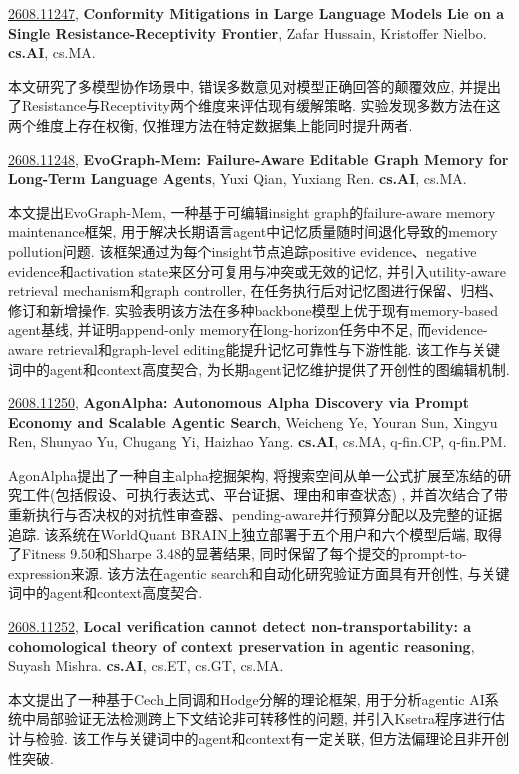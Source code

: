 \documentclass[9pt, a4paper]{article}
\theoremstyle{plain}
\theoremstyle{definition}
\theoremstyle{remark}
\newcommand{\arxivwithtarget}[3]{\hypertarget{#1}{}\href{https://arxiv.org/abs/#1}{#1}, \textbf{\textcolor{arxivblue}{#2}}, #3. }
\begin{document}
\arxivwithtarget{2608.11247}{Conformity Mitigations in Large Language Models Lie on a Single Resistance-Receptivity Frontier}{Zafar Hussain, Kristoffer Nielbo}\textbf{cs.AI}, cs.MA.

本文研究了多模型协作场景中, 错误多数意见对模型正确回答的颠覆效应, 并提出了Resistance与Receptivity两个维度来评估现有缓解策略. 实验发现多数方法在这两个维度上存在权衡, 仅推理方法在特定数据集上能同时提升两者.


\arxivwithtarget{2608.11248}{EvoGraph-Mem: Failure-Aware Editable Graph Memory for Long-Term Language Agents}{Yuxi Qian, Yuxiang Ren}\textbf{cs.AI}, cs.MA.

本文提出EvoGraph-Mem, 一种基于可编辑insight graph的failure-aware memory maintenance框架, 用于解决长期语言agent中记忆质量随时间退化导致的memory pollution问题. 该框架通过为每个insight节点追踪positive evidence、negative evidence和activation state来区分可复用与冲突或无效的记忆, 并引入utility-aware retrieval mechanism和graph controller, 在任务执行后对记忆图进行保留、归档、修订和新增操作. 实验表明该方法在多种backbone模型上优于现有memory-based agent基线, 并证明append-only memory在long-horizon任务中不足, 而evidence-aware retrieval和graph-level editing能提升记忆可靠性与下游性能. 该工作与关键词中的agent和context高度契合, 为长期agent记忆维护提供了开创性的图编辑机制.


\arxivwithtarget{2608.11250}{AgonAlpha: Autonomous Alpha Discovery via Prompt Economy and Scalable Agentic Search}{Weicheng Ye, Youran Sun, Xingyu Ren, Shunyao Yu, Chugang Yi, Haizhao Yang}\textbf{cs.AI}, cs.MA, q-fin.CP, q-fin.PM.

AgonAlpha提出了一种自主alpha挖掘架构, 将搜索空间从单一公式扩展至冻结的研究工件(包括假设、可执行表达式、平台证据、理由和审查状态) , 并首次结合了带重新执行与否决权的对抗性审查器、pending-aware并行预算分配以及完整的证据追踪. 该系统在WorldQuant BRAIN上独立部署于五个用户和六个模型后端, 取得了Fitness 9.50和Sharpe 3.48的显著结果, 同时保留了每个提交的prompt-to-expression来源. 该方法在agentic search和自动化研究验证方面具有开创性, 与关键词中的agent和context高度契合.


\arxivwithtarget{2608.11252}{Local verification cannot detect non-transportability: a cohomological theory of context preservation in agentic reasoning}{Suyash Mishra}\textbf{cs.AI}, cs.ET, cs.GT, cs.MA.

本文提出了一种基于Cech上同调和Hodge分解的理论框架, 用于分析agentic AI系统中局部验证无法检测跨上下文结论非可转移性的问题, 并引入Ksetra程序进行估计与检验. 该工作与关键词中的agent和context有一定关联, 但方法偏理论且非开创性突破.
\end{document}
